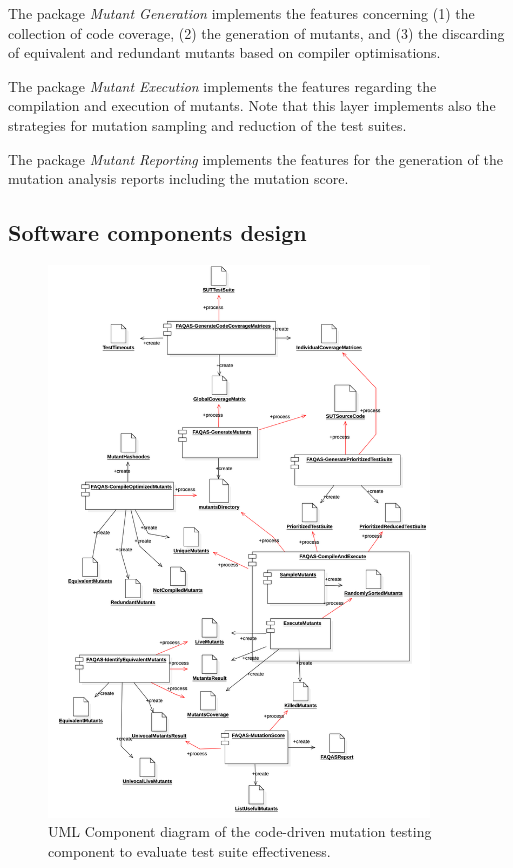 The package \textit{Mutant Generation} implements the features concerning (1) the collection of code coverage, (2) the generation of mutants, and (3) the discarding of equivalent and redundant mutants based on compiler optimisations.

The package \textit{Mutant Execution} implements the features regarding the compilation and execution of mutants. Note that this layer implements also the strategies for mutation sampling and reduction of the test suites.

The package \textit{Mutant Reporting} implements the features for the generation of the mutation analysis reports including the mutation score.



\clearpage

\subsection{Software components design}

\begin{figure}[tb]
  \centering
	\includegraphics[width=0.9\textwidth]{images/component.png}
      \caption{UML Component diagram of the code-driven mutation testing component to evaluate test suite effectiveness.}
      \label{fig:component_diagram}
\end{figure}

